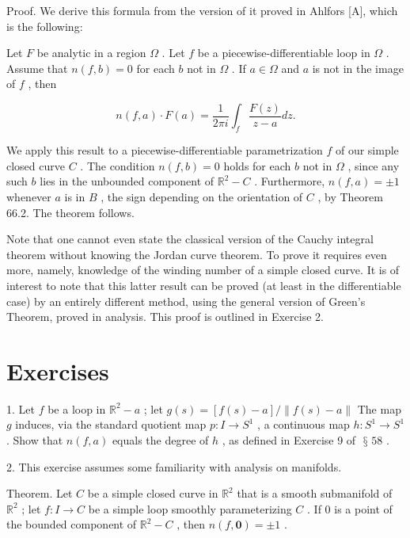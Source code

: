 \documentclass[10pt]{article}
\begin{document}
Proof. We derive this formula from the version of it proved in Ahlfors [A], which is the following:

Let \(F\) be analytic in a region \(\Omega\) . Let \(f\) be a piecewise-differentiable loop in \(\Omega\) . Assume that \(n\left( {f,b}\right)  = 0\) for each \(b\) not in \(\Omega\) . If \(a \in  \Omega\) and \(a\) is not in the image of \(f\) , then

\[
n\left( {f,a}\right)  \cdot  F\left( a\right)  = \frac{1}{2\pi i}{\int }_{f}\frac{F\left( z\right) }{z - a}{dz}.
\]

We apply this result to a piecewise-differentiable parametrization \(f\) of our simple closed curve \(C\) . The condition \(n\left( {f,b}\right)  = 0\) holds for each \(b\) not in \(\Omega\) , since any such \(b\) lies in the unbounded component of \({\mathbb{R}}^{2} - C\) . Furthermore, \(n\left( {f,a}\right)  =  \pm  1\) whenever \(a\) is in \(B\) , the sign depending on the orientation of \(C\) , by Theorem 66.2. The theorem follows.

Note that one cannot even state the classical version of the Cauchy integral theorem without knowing the Jordan curve theorem. To prove it requires even more, namely, knowledge of the winding number of a simple closed curve. It is of interest to note that this latter result can be proved (at least in the differentiable case) by an entirely different method, using the general version of Green's Theorem, proved in analysis. This proof is outlined in Exercise 2.

\section*{Exercises}

1. Let \(f\) be a loop in \({\mathbb{R}}^{2} - a\) ; let \(g\left( s\right)  = \left\lbrack  {f\left( s\right)  - a}\right\rbrack  /\parallel f\left( s\right)  - a\parallel\) The map \(g\) induces, via the standard quotient map \(p : I \rightarrow  {S}^{1}\) , a continuous map \(h : {S}^{1} \rightarrow  {S}^{1}\) . Show that \(n\left( {f,a}\right)\) equals the degree of \(h\) , as defined in Exercise 9 of \(\text{ § }{58}\) .

2. This exercise assumes some familiarity with analysis on manifolds.

Theorem. Let \(C\) be a simple closed curve in \({\mathbb{R}}^{2}\) that is a smooth submanifold of \({\mathbb{R}}^{2}\) ; let \(f : I \rightarrow  C\) be a simple loop smoothly parameterizing \(C\) . If 0 is a point of the bounded component of \({\mathbb{R}}^{2} - C\) , then \(n\left( {f,\mathbf{0}}\right)  =  \pm  1\) .
\end{document}
